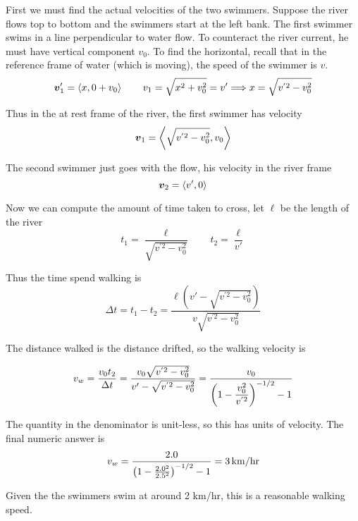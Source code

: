 \begin{exercise}
First we must find the actual velocities of the two swimmers. Suppose the river flows top to bottom and the swimmers start at the left bank. The first swimmer swims in a line perpendicular to water flow. To counteract the river current, he must have vertical component $v_0$. To find the horizontal, recall that in the reference frame of water (which is moving), the speed of the swimmer is $v$.
\[ \vec v_1' = \vbrack{x, 0 + v_0} \qquad v_1 = \sqrt{x^2 + v_0^2} = v' \thus x = \sqrt{v^{'2} - v_0^2} \]

Thus in the at rest frame of the river, the first swimmer has velocity
\[ \vec v_1 = \vbrack{\sqrt{v^{'2} - v_0^2}, v_0} \]

The second swimmer just goes with the flow, his velocity in the river frame
\[ \vec v_2 = \vbrack{v', 0} \]

Now we can compute the amount of time taken to cross, let $\ell$ be the length of the river
\[ t_1 = \frac{\ell}{\sqrt{v^{'2} - v_0^2}} \qquad t_2 = \frac{\ell}{v'} \]

Thus the time spend walking is
\[ \Delta t = t_1 - t_2 = \frac{\ell(v' - \sqrt{v^{'2} - v_0^2})}{v \sqrt{v^{'2} - v_0^2}} \]

The distance walked is the distance drifted, so the walking velocity is
\begin{answer}
	\[ v_w = \frac{v_0 t_2}{\Delta t} = \frac{v_0 \sqrt{v^{'2} - v_0^2} }{v' - \sqrt{v^{'2} - v_0^2}} = \frac{v_0}{\qty( 1 - \dfrac{v_0^2}{v^{'2}} )^{-1/2} - 1} \]
\end{answer}

The quantity in the denominator is unit-less, so this has units of velocity. The final numeric answer is
\[ v_w = \frac{2.0}{\qty(1 - \frac{2.0^2}{2.5^2})^{-1/2} - 1} = \SI{3}{km/hr} \]

Given the the swimmers swim at around 2 km/hr, this is a reasonable walking speed.
\end{exercise}


